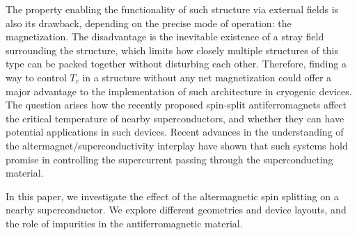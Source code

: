 \documentclass[aps,twocolumn,amsmath,amssymb,preprintnumbers,floatfix,prl,superscriptaddress,longbibliography]{revtex4-2}%
\begin{document}
The property enabling the functionality of such structure via external fields is also its drawback, depending on the precise mode of operation: the magnetization. The disadvantage is the inevitable existence of a stray field surrounding the structure, which limits how closely multiple structures of this type can be packed together without disturbing each other. Therefore, finding a way to control $T_c$ in a structure without any net magnetization could offer a major advantage to the implementation of such architecture in cryogenic devices.
The question arises how the recently proposed spin-split antiferromagnets affect the critical temperature of nearby superconductors, and whether they can have potential applications in such devices. 
Recent advances in the understanding of the altermagnet/superconductivity interplay \cite{sun_arx_23, ouassou_arx_23} have shown that such systems hold promise in controlling the supercurrent passing through the superconducting material. 

In this paper, we investigate the effect of the altermagnetic spin splitting on a nearby superconductor. We explore different geometries and device layouts, and the role of impurities in the antiferromagnetic material. 
\end{document}
